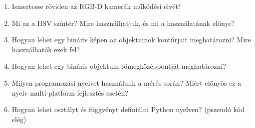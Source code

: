 \documentclass[12pt,a4paper,oneside]{report}             %
\begin{document}
\begin{enumerate}
\item Ismertesse röviden az RGB-D kamerák működési elvét!
\item Mi az a HSV színtér? Mire használhatjuk, és mi a használatának előnye?
\item Hogyan lehet egy bináris képen az objektumok kontúrjait meghatározni? Mire használhatók ezek fel?
\item Hogyan lehet egy bináris objektum tömegközéppontját meghatározni?
\item Milyen programozási nyelvet használunk a mérés során? Miért előnyös ez a nyelv multi-platform fejlesztés esetén?
\item Hogyan lehet osztályt és függvényt definiálni Python nyelven? (pszeudó kód elég)
\end{enumerate}

\printbibliography
\end{document}
